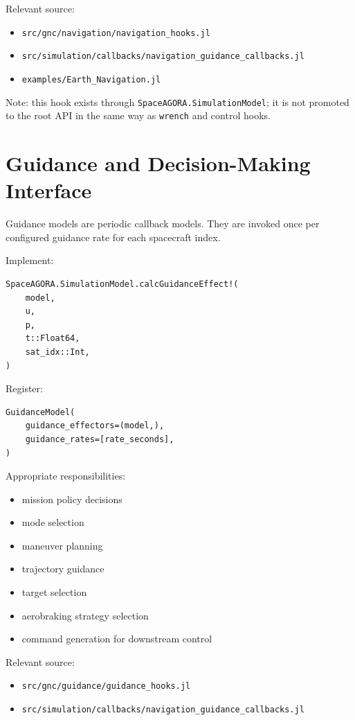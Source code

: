 \documentclass[11pt]{article}
\begin{document}
Relevant source:
\begin{itemize}
  \item \texttt{src/gnc/navigation/navigation\_hooks.jl}
  \item \texttt{src/simulation/callbacks/navigation\_guidance\_callbacks.jl}
  \item \texttt{examples/Earth\_Navigation.jl}
\end{itemize}

Note: this hook exists through \texttt{SpaceAGORA.SimulationModel}; it is not
promoted to the root API in the same way as \texttt{wrench} and control hooks.

\section{Guidance and Decision-Making Interface}

Guidance models are periodic callback models. They are invoked once per
configured guidance rate for each spacecraft index.

Implement:

\begin{lstlisting}
SpaceAGORA.SimulationModel.calcGuidanceEffect!(
    model,
    u,
    p,
    t::Float64,
    sat_idx::Int,
)
\end{lstlisting}

Register:

\begin{lstlisting}
GuidanceModel(
    guidance_effectors=(model,),
    guidance_rates=[rate_seconds],
)
\end{lstlisting}

Appropriate responsibilities:
\begin{itemize}
  \item mission policy decisions
  \item mode selection
  \item maneuver planning
  \item trajectory guidance
  \item target selection
  \item aerobraking strategy selection
  \item command generation for downstream control
\end{itemize}

Relevant source:
\begin{itemize}
  \item \texttt{src/gnc/guidance/guidance\_hooks.jl}
  \item \texttt{src/simulation/callbacks/navigation\_guidance\_callbacks.jl}
\end{itemize}
\end{document}
